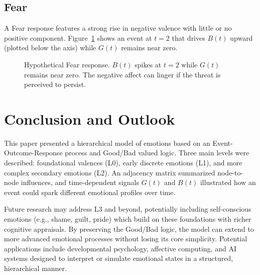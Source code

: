 \documentclass[11pt]{article}
\begin{document}
\subsection{Fear}
A Fear response features a strong rise in negative valence with little or no positive component. Figure~\ref{fig:fear-waveform} shows an event at \(t=2\) that drives \(B(t)\) upward (plotted below the axis) while \(G(t)\) remains near zero.

\begin{figure}[htbp]
\centering
{}
\caption{Hypothetical Fear response. $B(t)$ spikes at $t=2$ while $G(t)$ remains near zero. The negative affect can linger if the threat is perceived to persist.}
\label{fig:fear-waveform}
\end{figure}

\section{Conclusion and Outlook}
\label{sec:conclusion}
This paper presented a hierarchical model of emotions based on an Event-Outcome-Response process and Good/Bad valued logic. Three main levels were described: foundational valences (L0), early discrete emotions (L1), and more complex secondary emotions (L2). An adjacency matrix summarized node-to-node influences, and time-dependent signals \(G(t)\) and \(B(t)\) illustrated how an event could spark different emotional profiles over time.

Future research may address L3 and beyond, potentially including self-conscious emotions (e.g., shame, guilt, pride) which build on these foundations with richer cognitive appraisals. By preserving the Good/Bad logic, the model can extend to more advanced emotional processes without losing its core simplicity. Potential applications include developmental psychology, affective computing, and AI systems designed to interpret or simulate emotional states in a structured, hierarchical manner.
\end{document}
